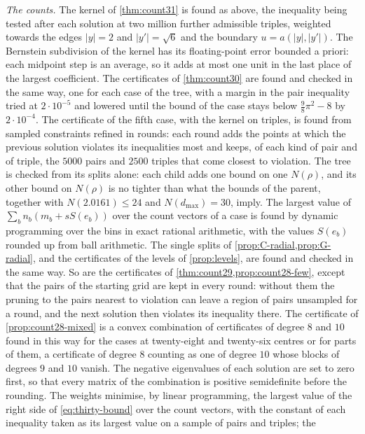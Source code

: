 \documentclass[11pt,reqno]{amsart}
\renewcommand{\_}{\origunderscore\allowbreak}
\numberwithin{equation}{section}
\theoremstyle{plain}
\theoremstyle{definition}
\theoremstyle{remark}
\begin{document}
\emph{The counts.} The kernel of \cref{thm:count31} is found as above, the
inequality being tested after each solution at two million further
admissible triples, weighted towards the edges $|y|=2$ and $|y'|=\sqrt6$ and
the boundary $u=a(|y|,|y'|)$. The Bernstein subdivision of the kernel has
its floating-point error bounded a priori: each midpoint step is an average,
so it adds at most one unit in the last place of the largest coefficient.
The certificates of \cref{thm:count30} are found and checked in the same
way, one for each case of the tree, with a margin in the pair inequality
tried at $2\cdot10^{-5}$ and lowered until the bound of the case stays below
$\frac98\pi^2-8$ by $2\cdot10^{-4}$. The certificate of the fifth case,
with the kernel on triples, is found from sampled constraints refined in
rounds: each round adds the points at which the previous solution violates
its inequalities most and keeps, of each kind of pair and of triple, the
$5000$ pairs and $2500$ triples that come closest to violation. The tree is checked from its splits
alone: each child adds one bound on one $N(\rho)$, and its other bound on
$N(\rho)$ is no tighter than what the bounds of the parent, together with
$N(2.0161)\le24$ and $N(d_{\max})=30$, imply. The largest value of
$\sum_bn_b(m_b+sS(e_b))$ over the count vectors of a case is found by
dynamic programming over the bins in exact rational arithmetic, with the
values $S(e_b)$ rounded up from ball arithmetic. The single splits of
\cref{prop:C-radial,prop:G-radial}, and the certificates of the levels of
\cref{prop:levels}, are found and checked in the same way. So are the
certificates of \cref{thm:count29,prop:count28-few}, except that the pairs of
the starting grid are kept in every round: without them the pruning to the pairs nearest to
violation can leave a region of pairs unsampled for a round, and the next
solution then violates its inequality there. The certificate of
\cref{prop:count28-mixed} is a convex combination of certificates of degree
$8$ and $10$ found in this way for the cases at twenty-eight and twenty-six
centres or for parts of them, a certificate of degree $8$ counting as one of degree
$10$ whose blocks of degrees $9$ and $10$ vanish. The negative eigenvalues of
each solution are set to zero first, so that every matrix of the combination
is positive semidefinite before the rounding. The weights minimise, by
linear programming, the largest value of the right side of
\eqref{eq:thirty-bound} over the count vectors, with the constant of each
inequality taken as its largest value on a sample of pairs and triples; the
\end{document}
